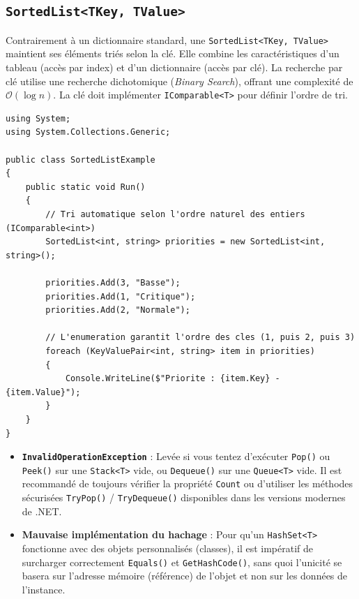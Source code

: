 \subsection{\texttt{SortedList<TKey, TValue>}}

Contrairement à un dictionnaire standard, une \texttt{SortedList<TKey, TValue>} maintient ses éléments triés selon la clé. Elle combine les caractéristiques d'un tableau (accès par index) et d'un dictionnaire (accès par clé). La recherche par clé utilise une recherche dichotomique (\textit{Binary Search}), offrant une complexité de $\mathcal{O}(\log n)$.
La clé doit implémenter \texttt{IComparable<T>} pour définir l'ordre de tri.

\begin{lstlisting}[language={[Sharp]C}]
using System;
using System.Collections.Generic;

public class SortedListExample
{
    public static void Run()
    {
        // Tri automatique selon l'ordre naturel des entiers (IComparable<int>)
        SortedList<int, string> priorities = new SortedList<int, string>();
        
        priorities.Add(3, "Basse");
        priorities.Add(1, "Critique");
        priorities.Add(2, "Normale");
        
        // L'enumeration garantit l'ordre des cles (1, puis 2, puis 3)
        foreach (KeyValuePair<int, string> item in priorities)
        {
            Console.WriteLine($"Priorite : {item.Key} - {item.Value}");
        }
    }
}
\end{lstlisting}

\vspace{0.5cm}

\begin{tcolorbox}[colback=red!5!white,colframe=red!75!black,title=Pièges et Exceptions Courantes]
\begin{itemize}
    \item \textbf{\texttt{InvalidOperationException}} : Levée si vous tentez d'exécuter \texttt{Pop()} ou \texttt{Peek()} sur une \texttt{Stack<T>} vide, ou \texttt{Dequeue()} sur une \texttt{Queue<T>} vide. Il est recommandé de toujours vérifier la propriété \texttt{Count} ou d'utiliser les méthodes sécurisées \texttt{TryPop()} / \texttt{TryDequeue()} disponibles dans les versions modernes de .NET.
    \item \textbf{Mauvaise implémentation du hachage} : Pour qu'un \texttt{HashSet<T>} fonctionne avec des objets personnalisés (classes), il est impératif de surcharger correctement \texttt{Equals()} et \texttt{GetHashCode()}, sans quoi l'unicité se basera sur l'adresse mémoire (référence) de l'objet et non sur les données de l'instance.
\end{itemize}
\end{tcolorbox}

